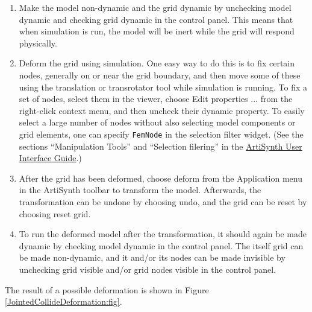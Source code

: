 \begin{enumerate}

\item Make the model non-dynamic and the grid dynamic by unchecking
{\sf model dynamic} and checking {\sf grid dynamic} in the control
panel. This means that when simulation is run, the model will be inert
while the grid will respond physically.

\item Deform the grid using simulation. One easy way to do this is to
fix certain nodes, generally on or near the grid boundary, and then
move some of these using the translation or transrotator
tool while simulation is running. To fix a set of nodes, select
them in the viewer, choose {\sf Edit properties ...} from the
right-click context menu, and then uncheck their {\sf dynamic} property.
To easily select a large number of nodes without also selecting
model components or grid elements, one can specify {\tt FemNode}
in the selection filter widget. (See the sections
``Manipulation Tools'' and ``Selection filering'' in the
\href{../uiguide/uiguide.html}{ArtiSynth User Interface Guide}.)

\item After the grid has been deformed, choose {\sf deform} from the
{\sf Application} menu in the ArtiSynth toolbar to transform the model.
Afterwards, the transformation can be undone by choosing {\sf undo},
and the grid can be reset by choosing {\sf reset grid}.

\item To run the deformed model after the transformation, it should
again be made dynamic by checking {\sf model dynamic} in the control
panel.  The itself grid can be made non-dynamic, and it and/or its
nodes can be made invisible by unchecking {\sf grid visible} and/or
{\sf grid nodes visible} in the control panel.

\end{enumerate}

The result of a possible deformation is shown in Figure
\ref{JointedCollideDeformation:fig}.

